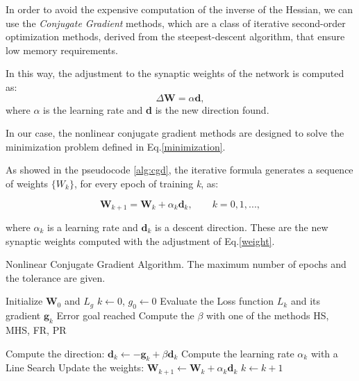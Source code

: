 		In order to avoid the expensive computation of the inverse of the Hessian, we can use the \textit{Conjugate Gradient} methods, which are a class of iterative second-order optimization methods, derived from the steepest-descent algorithm, that ensure low memory requirements.

		In this way, the adjustment to the synaptic weights of the network is computed as:
		 \begin{equation}
		 	\label{weight}
		    \Delta\textbf{W} = \alpha\textbf{d},
		 \end{equation}
		where $\alpha$ is the learning rate and \textbf{d} is the new direction found.

		In our case, the nonlinear conjugate gradient methods are designed to solve the minimization problem defined in Eq.\ref{minimization}.

		As showed in the pseudocode \ref{alg:cgd}, the iterative formula generates a sequence of weights $\{W_k\}$, for every epoch of training \textit{k}, as:

		\begin{equation}
			\textbf{W}_{k+1} = \textbf{W}_{k} + \alpha_k\textbf{d}_k, \text{  }\text{  }\text{  } \textit{k} = 0,1,...,
		\end{equation}

		where $\alpha_k$ is a learning rate and $\textbf{d}_k$ is a descent direction. These are the new synaptic weights computed with the adjustment of Eq.\ref{weight}.


		\begin{algorithm}[H]
			\caption{Nonlinear Conjugate Gradient Algorithm. The maximum number of epochs and the tolerance are given.}
			\label{alg:cgd}
			\begin{algorithmic}[1]
					\State Initialize $\textbf{W}_0$ and $\textit{L}_g$
					\State $k \gets 0$, $g_0 \gets 0$
						\State Evaluate the Loss function $\textit{L}_k$ and its gradient $\textbf{g}_k$
							\State
							\Return Error goal reached
						\EndIf
						\State Compute the $\beta$ with one of the methods HS, MHS, FR, PR

						\State Compute the direction: $\textbf{d}_k \gets - \textbf{g}_k + \beta\textbf{d}_k$
						\State Compute the learning rate $\alpha_k$ with a Line Search
						\State Update the weights: $\textbf{W}_{k+1} \gets \textbf{W}_{k} + \alpha_k\textbf{d}_k$
						\State $k \gets k + 1$
					\EndWhile
				\EndProcedure
			\end{algorithmic}
		\end{algorithm}


